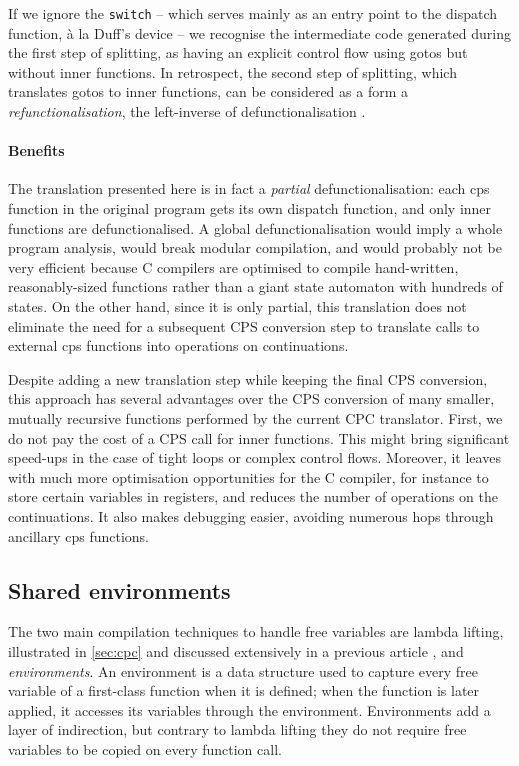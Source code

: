 \documentclass[a4paper]{llncs}
\begin{document}
If we ignore the \texttt{switch} -- which serves mainly as an entry point to the
dispatch function, à la Duff's device \cite{duff} -- we recognise the
intermediate code generated during the first step of splitting, as having an
explicit control flow using gotos but without inner functions.  In retrospect,
the second step of splitting, which translates gotos to inner functions, can be
considered as a form a \emph{refunctionalisation}, the left-inverse of
defunctionalisation \cite{DBLP:conf/ppdp/DanvyN01}.

\paragraph{Benefits}

The translation presented here is in fact a \emph{partial} defunctionalisation:
each cps function in the original program gets its own dispatch function, and
only inner functions are defunctionalised.  A global defunctionalisation would
imply a whole program analysis, would break modular compilation, and would probably
not be very efficient because C compilers are optimised to compile hand-written,
reasonably-sized functions rather than a giant state automaton with hundreds of
states.  On the other hand, since it is only partial, this translation does not
eliminate the need for a subsequent CPS conversion step to translate calls to
external cps functions into operations on continuations.

Despite adding a new translation step while keeping the final CPS conversion,
this approach has several advantages over the CPS conversion of many smaller,
mutually recursive functions performed by the current CPC translator.  First,
we do not pay the cost of a CPS call for inner functions.  This might bring
significant speed-ups in the case of tight loops or complex control flows.
Moreover, it leaves with much more optimisation opportunities for the C
compiler, for instance to store certain variables in registers, and reduces
the number of operations on the continuations.  It also makes debugging
easier, avoiding numerous hops through ancillary cps functions.

\subsection{Shared environments}
\label{sec:env}

The two main compilation techniques to handle free variables are
lambda lifting, illustrated in \cref{sec:cpc} and discussed extensively in a
previous article \cite{kerneis2011}, and \emph{environments}.  An environment is
a data structure used to capture every free variable of a first-class function
when it is defined; when the function is later applied, it accesses its
variables through the environment.  Environments add a layer of indirection, but
contrary to lambda lifting they do not require free variables to be copied on every
function call.
\end{document}
